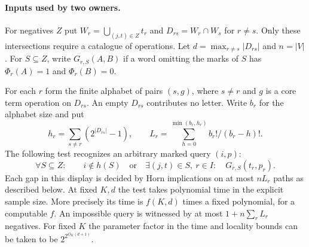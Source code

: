 \paragraph{Inputs used by two owners.}
For negatives $Z$ put $W_r=\bigcup_{(j,t)\in Z}t_r$ and
$D_{rs}=W_r\cap W_s$ for $r\ne s$. Only these intersections require
a catalogue of operations. Let $d=\max_{r\ne s}|D_{rs}|$ and
$n=|V|$. For $S\subseteq Z$, write $G_{r,S}(A,B)$ if a word
omitting the marks of $S$ has $\Phi_r(A)=1$ and $\Phi_r(B)=0$.

\begin{theorem}
\label{core:thm:palette-overlap}
For each $r$ form the finite alphabet of pairs $(s,g)$, where $s\ne r$
and $g$ is a core term operation on $D_{rs}$. An empty $D_{rs}$
contributes no letter. Write $b_r$ for the alphabet size and put
\[
 h_r=\sum_{s\ne r}(2^{|D_{rs}|}-1),\qquad
 L_r=\sum_{h=0}^{\min(b_r,h_r)} b_r!/(b_r-h)! .
\]
The following test recognizes an arbitrary marked query $(i,p)$:
\[
 \forall S\subseteq Z:\qquad
 i\notin h(S)\quad\text{or}\quad
 \exists (j,t)\in S,\ r\in I:\quad G_{r,S}(t_r,p_r).
\]
Each gap in this display is decided by Horn implications on at most
$nL_r$ paths as described below. At fixed $K,d$ the test takes
polynomial time in the explicit sample size. More precisely its time
is $f(K,d)$ times a fixed polynomial, for a computable $f$.
An impossible query is witnessed by at most $1+n\sum_rL_r$ negatives.
For fixed $K$ the parameter factor in the time and locality bounds
can be taken to be $2^{2^{O_K(d+1)}}$.
\end{theorem}
